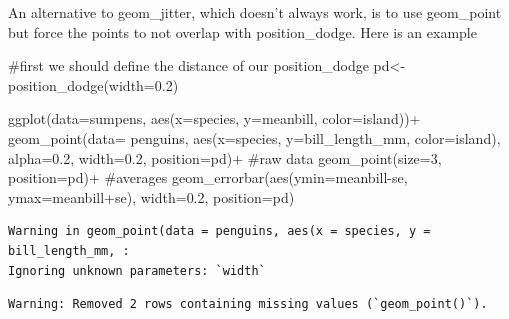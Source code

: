 \documentclass[
  letterpaper,
  DIV=11,
  numbers=noendperiod]{scrartcl}
\newenvironment{Shaded}{\begin{snugshade}}{\end{snugshade}}
\newcommand{\AttributeTok}[1]{\textcolor[rgb]{0.40,0.45,0.13}{#1}}
\newcommand{\CommentTok}[1]{\textcolor[rgb]{0.37,0.37,0.37}{#1}}
\newcommand{\DecValTok}[1]{\textcolor[rgb]{0.68,0.00,0.00}{#1}}
\newcommand{\FloatTok}[1]{\textcolor[rgb]{0.68,0.00,0.00}{#1}}
\newcommand{\FunctionTok}[1]{\textcolor[rgb]{0.28,0.35,0.67}{#1}}
\newcommand{\NormalTok}[1]{\textcolor[rgb]{0.00,0.23,0.31}{#1}}
\newcommand{\OtherTok}[1]{\textcolor[rgb]{0.00,0.23,0.31}{#1}}
\newcommand{\SpecialCharTok}[1]{\textcolor[rgb]{0.37,0.37,0.37}{#1}}
\begin{document}
An alternative to geom\_jitter, which doesn't always work, is to use
geom\_point but force the points to not overlap with position\_dodge.
Here is an example

\begin{Shaded}
\begin{Highlighting}[]
\CommentTok{\#first we should define the distance of our position\_dodge}
\NormalTok{pd}\OtherTok{\textless{}{-}}\FunctionTok{position\_dodge}\NormalTok{(}\AttributeTok{width=}\FloatTok{0.2}\NormalTok{)}

\FunctionTok{ggplot}\NormalTok{(}\AttributeTok{data=}\NormalTok{sumpens, }\FunctionTok{aes}\NormalTok{(}\AttributeTok{x=}\NormalTok{species, }\AttributeTok{y=}\NormalTok{meanbill, }\AttributeTok{color=}\NormalTok{island))}\SpecialCharTok{+}
  \FunctionTok{geom\_point}\NormalTok{(}\AttributeTok{data=}\NormalTok{ penguins, }\FunctionTok{aes}\NormalTok{(}\AttributeTok{x=}\NormalTok{species, }\AttributeTok{y=}\NormalTok{bill\_length\_mm, }\AttributeTok{color=}\NormalTok{island), }\AttributeTok{alpha=}\FloatTok{0.2}\NormalTok{, }\AttributeTok{width=}\FloatTok{0.2}\NormalTok{, }\AttributeTok{position=}\NormalTok{pd)}\SpecialCharTok{+} \CommentTok{\#raw data}
  \FunctionTok{geom\_point}\NormalTok{(}\AttributeTok{size=}\DecValTok{3}\NormalTok{, }\AttributeTok{position=}\NormalTok{pd)}\SpecialCharTok{+} \CommentTok{\#averages}
  \FunctionTok{geom\_errorbar}\NormalTok{(}\FunctionTok{aes}\NormalTok{(}\AttributeTok{ymin=}\NormalTok{meanbill}\SpecialCharTok{{-}}\NormalTok{se, }\AttributeTok{ymax=}\NormalTok{meanbill}\SpecialCharTok{+}\NormalTok{se), }\AttributeTok{width=}\FloatTok{0.2}\NormalTok{, }\AttributeTok{position=}\NormalTok{pd)}
\end{Highlighting}
\end{Shaded}

\begin{verbatim}
Warning in geom_point(data = penguins, aes(x = species, y = bill_length_mm, :
Ignoring unknown parameters: `width`
\end{verbatim}

\begin{verbatim}
Warning: Removed 2 rows containing missing values (`geom_point()`).
\end{verbatim}
\end{document}
